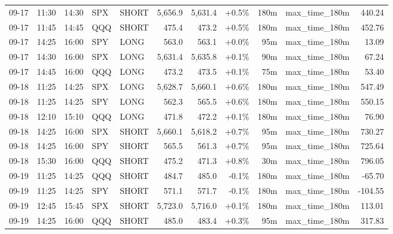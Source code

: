 \documentclass[11pt,a4paper,twoside]{article}
\begin{document}
\begin{center}
\begin{longtable}{>{\color{txtmain}}l l l l l r r r r >{\color{txtmain}}l r}
09-17 & 11:30 & 14:30 & SPX & SHORT & 5,656.9 & 5,631.4 & \textcolor{wingreen}{+0.5\%} & 180m & max\_time\_180m & \textcolor{wingreen}{440.24} \\
09-17 & 11:45 & 14:45 & QQQ & SHORT & 475.4 & 473.2 & \textcolor{wingreen}{+0.5\%} & 180m & max\_time\_180m & \textcolor{wingreen}{452.76} \\
09-17 & 14:25 & 16:00 & SPY & LONG & 563.0 & 563.1 & \textcolor{wingreen}{+0.0\%} & 95m & max\_time\_180m & \textcolor{wingreen}{13.09} \\
09-17 & 14:30 & 16:00 & SPX & LONG & 5,631.4 & 5,635.8 & \textcolor{wingreen}{+0.1\%} & 90m & max\_time\_180m & \textcolor{wingreen}{67.24} \\
09-17 & 14:45 & 16:00 & QQQ & LONG & 473.2 & 473.5 & \textcolor{wingreen}{+0.1\%} & 75m & max\_time\_180m & \textcolor{wingreen}{53.40} \\
09-18 & 11:25 & 14:25 & SPX & LONG & 5,628.7 & 5,660.1 & \textcolor{wingreen}{+0.6\%} & 180m & max\_time\_180m & \textcolor{wingreen}{547.49} \\
09-18 & 11:25 & 14:25 & SPY & LONG & 562.3 & 565.5 & \textcolor{wingreen}{+0.6\%} & 180m & max\_time\_180m & \textcolor{wingreen}{550.15} \\
09-18 & 12:10 & 15:10 & QQQ & LONG & 471.8 & 472.2 & \textcolor{wingreen}{+0.1\%} & 180m & max\_time\_180m & \textcolor{wingreen}{76.90} \\
09-18 & 14:25 & 16:00 & SPX & SHORT & 5,660.1 & 5,618.2 & \textcolor{wingreen}{+0.7\%} & 95m & max\_time\_180m & \textcolor{wingreen}{730.27} \\
09-18 & 14:25 & 16:00 & SPY & SHORT & 565.5 & 561.3 & \textcolor{wingreen}{+0.7\%} & 95m & max\_time\_180m & \textcolor{wingreen}{725.64} \\
09-18 & 15:30 & 16:00 & QQQ & SHORT & 475.2 & 471.3 & \textcolor{wingreen}{+0.8\%} & 30m & max\_time\_180m & \textcolor{wingreen}{796.05} \\
09-19 & 11:25 & 14:25 & QQQ & SHORT & 484.7 & 485.0 & \textcolor{lossred}{-0.1\%} & 180m & max\_time\_180m & \textcolor{lossred}{-65.70} \\
09-19 & 11:25 & 14:25 & SPY & SHORT & 571.1 & 571.7 & \textcolor{lossred}{-0.1\%} & 180m & max\_time\_180m & \textcolor{lossred}{-104.55} \\
09-19 & 12:45 & 15:45 & SPX & SHORT & 5,723.0 & 5,716.0 & \textcolor{wingreen}{+0.1\%} & 180m & max\_time\_180m & \textcolor{wingreen}{113.01} \\
09-19 & 14:25 & 16:00 & QQQ & SHORT & 485.0 & 483.4 & \textcolor{wingreen}{+0.3\%} & 95m & max\_time\_180m & \textcolor{wingreen}{317.83} \\

\end{longtable}
\end{center}
\end{document}
